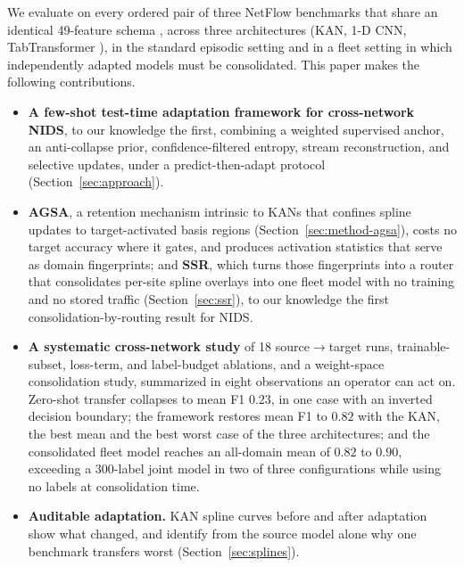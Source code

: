 \documentclass[10pt, conference, letterpaper]{IEEEtran}
\begin{document}
We evaluate on every ordered pair of three NetFlow benchmarks that share
an identical 49-feature schema \cite{sarhan2022netflow}, across three
architectures (KAN, 1-D CNN, TabTransformer
\cite{huang2020tabtransformer}), in the standard episodic setting and
in a fleet setting in which independently adapted models must be
consolidated. This paper makes the following contributions.

\begin{itemize}
  \item \textbf{A few-shot test-time adaptation framework for
  cross-network NIDS}, to our knowledge the first, combining a weighted
  supervised anchor, an anti-collapse prior, confidence-filtered
  entropy, stream reconstruction, and selective updates, under a
  predict-then-adapt protocol (Section~\ref{sec:approach}).
  \item \textbf{AGSA}, a retention mechanism intrinsic to KANs that
  confines spline updates to target-activated basis regions
  (Section~\ref{sec:method-agsa}), costs no target accuracy where it
  gates, and produces activation statistics that serve as domain
  fingerprints; and \textbf{SSR}, which turns those fingerprints into a
  router that consolidates per-site spline overlays into one fleet
  model with no training and no stored traffic (Section~\ref{sec:ssr}),
  to our knowledge the first consolidation-by-routing result for NIDS.
  \item \textbf{A systematic cross-network study} of 18
  source$\to$target runs, trainable-subset, loss-term, and label-budget
  ablations, and a weight-space consolidation study, summarized in
  eight observations an operator can act on. Zero-shot transfer
  collapses to mean F1 $0.23$, in one case with an inverted decision
  boundary; the framework restores mean F1 to $0.82$ with the KAN, the
  best mean and the best worst case of the three architectures; and
  the consolidated fleet model reaches an all-domain
  mean of $0.82$ to $0.90$, exceeding a 300-label joint model in two of
  three configurations while using no labels at consolidation time.
  \item \textbf{Auditable adaptation.} KAN spline curves before and
  after adaptation show what changed, and identify from the source
  model alone why one benchmark transfers worst
  (Section~\ref{sec:splines}).
\end{itemize}
\end{document}
